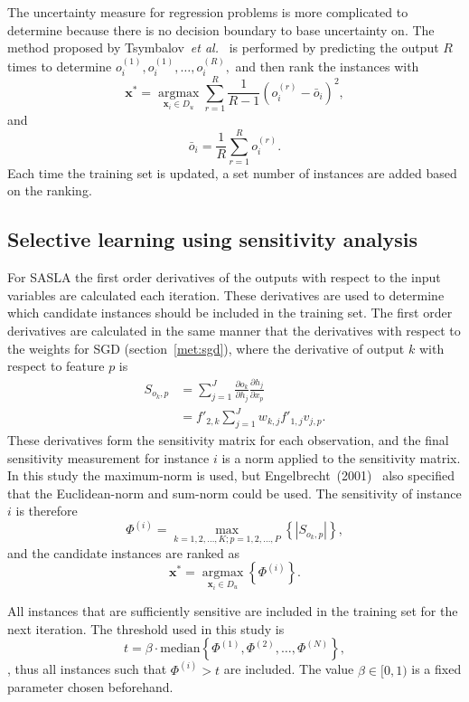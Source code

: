 \documentclass[conference]{IEEEtran}
\begin{document}
	The uncertainty measure for regression problems is more complicated to determine because there is no decision boundary to base uncertainty on. The method proposed by Tsymbalov~\textsl{et al.}~\cite{dropoutsasla} is performed by predicting the output $R$ times to determine $o_i^{(1)}, o_i^{(1)}, \ldots, o_i^{(R)},$ and then rank the instances with
	\[
	\boldsymbol{x}^* = \operatorname*{argmax}_{\boldsymbol{x}_i \in D_u} \sum_{r=1}^{R} \frac{1}{R-1}\left( o_i^{(r)} - \bar{o}_i\right)^2, 
	\] 
	and \[\bar{o}_i = \frac{1}{R} \sum_{r=1}^{R} o_i^{(r)}.\] Each time the training set is updated, a set number of instances are added based on the ranking.
	
	\subsection{Selective learning using sensitivity analysis}
	For SASLA the first order derivatives of the outputs with respect to the input variables are calculated each iteration. These derivatives are used to determine which candidate instances should be included in the training set. The first order derivatives are calculated in the same manner that the derivatives with respect to the weights for SGD (section~\ref{met:sgd}), where the derivative of output $k$ with respect to feature $p$ is 
	\[
	\begin{aligned}
		S_{o_k,p}
		&= \sum_{j=1}^{J}
		\frac{\partial o_k}{\partial h_j}
		\frac{\partial h_j}{\partial x_p} \\
		&= f'_{2,k} \sum_{j=1}^{J}
		w_{k,j} f'_{1,j} v_{j,p}.
	\end{aligned}
	\]
	These derivatives form the sensitivity matrix for each observation, and the final sensitivity measurement for instance $i$ is a norm applied to the sensitivity matrix. In this study the maximum-norm is used, but Engelbrecht~(2001)~\cite{sasla} also specified that the Euclidean-norm and sum-norm could be used. The sensitivity of instance $i$ is therefore \[\Phi^{(i)} = \max_{k=1, 2, \ldots, K; p=1, 2, \ldots, P} \left\{\left|S_{o_k,p}\right|\right\},\] and the candidate instances are  ranked as \[\boldsymbol{x}^* = \operatorname*{argmax}_{\boldsymbol{x}_i \in D_u} \left\{ \Phi^{(i)}\right\}.\]
	
	All instances that are sufficiently sensitive are included in the training set for the next iteration. The threshold used in this study is 
	\[
		t = \beta \cdot \text{median} \left\{ \Phi^{(1)}, \Phi^{(2)}, \ldots, \Phi^{(N)}\right\},
	\], thus all instances such that $\Phi^{(i)} > t$ are included. The value $\beta \in [0, 1)$ is a fixed parameter chosen beforehand.
	
\end{document}
